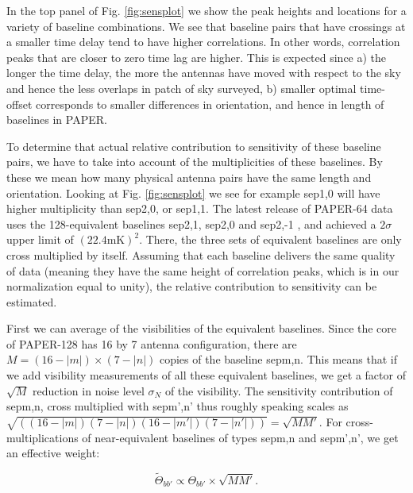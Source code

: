 \documentclass[twocolumn,apj,numberedappendix]{emulateapj}
\renewcommand\[{\begin{equation}}
\renewcommand\]{\end{equation}}
\begin{document}
In the top panel of Fig. \ref{fig:sensplot}
we show the peak heights and locations for a variety of baseline combinations.
We see that baseline pairs that have crossings at a smaller time delay
tend to have higher correlations. In other words, correlation peaks
that are closer to zero time lag are higher. This is expected since
a) the longer the time delay, the more the antennas have moved with respect
to the sky and hence the less overlaps in patch of sky surveyed, b) smaller optimal
time-offset corresponds to smaller differences in orientation, and hence in length of
baselines in PAPER. 




To determine that actual relative contribution to sensitivity of these
baseline pairs, we have to take into account of the multiplicities of
these baselines. By these we mean how many physical antenna pairs have the
same length and orientation. Looking at Fig. \ref{fig:sensplot}
we see for example sep1,0 will have higher multiplicity than sep2,0,
or sep1,1. The latest release of PAPER-64 data uses the 128-equivalent baselines sep2,1,
sep2,0 and sep2,-1 \citep{Ali2015}, and achieved a $2\sigma$ upper
limit of $(22.4\text{mK})^{2}$. There, the three sets of equivalent baselines
are only cross multiplied by itself. Assuming that each baseline delivers
the same quality of data (meaning they have the same height of correlation
peaks, which is in our normalization equal to unity), the relative
contribution to sensitivity can be estimated. 

First we can average of the visibilities of the equivalent baselines. Since the core of PAPER-128 has 16 by 7 antenna configuration, there
are $M=(16-|m|)\times(7-|n|)$ copies of the baseline sepm,n. This means
that if we add visibility measurements of all these equivalent baselines,
we get a factor of $\sqrt{M}$ reduction in noise
level $\sigma_N$ of the visibility. The sensitivity contribution of sepm,n, cross multiplied with sepm',n'  thus roughly speaking scales as $\sqrt{\left((16-|m|)(7-|n|)(16-|m'|)(7-|n'|)\right)}=\sqrt{MM'}$.
For cross-multiplications of near-equivalent baselines of
types sepm,n and sepm',n', we get an effective weight: 

\begin{equation}
\widetilde{\Theta}_{bb'} \propto \Theta_{bb'}\times\sqrt{MM'}.\label{eq:sensul}
\end{equation}
\end{document}
